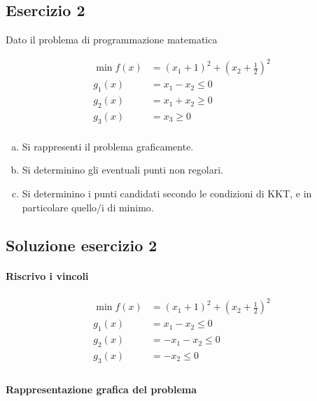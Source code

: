 \documentclass[\main/main.tex]{subfiles}
\begin{document}
\subsection{Esercizio 2}
Dato il problema di programmazione matematica

\begin{align*}
  \min f(x) & = (x_1+1)^2 + (x_2 + \frac{1}{2})^2 \\
  g_1(x)    & = x_1 - x_2 \leq 0                  \\
  g_2(x)    & = x_1 + x_2 \geq 0                  \\
  g_3(x)    & = x_3 \geq 0                        \\
\end{align*}

\begin{enumerate}[a)]
  \item Si rappresenti il problema graficamente.
  \item Si determinino gli eventuali punti non regolari.
  \item Si determinino i punti candidati secondo le condizioni di KKT, e in particolare quello/i di minimo.
\end{enumerate}

\subsection{Soluzione esercizio 2}

\paragraph*{Riscrivo i vincoli}
\begin{align*}
  \min f(x) & = (x_1+1)^2 + (x_2 + \frac{1}{2})^2 \\
  g_1(x)    & = x_1 - x_2 \leq 0                  \\
  g_2(x)    & = -x_1 - x_2 \leq 0                 \\
  g_3(x)    & = -x_2 \leq 0                       \\
\end{align*}

\paragraph*{Rappresentazione grafica del problema}
\end{document}
